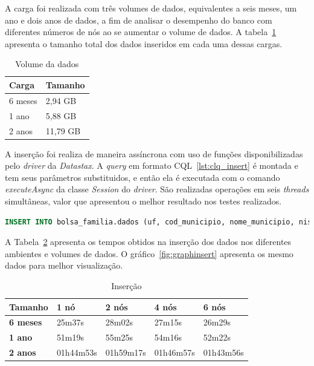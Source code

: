 A carga foi realizada com três volumes de dados, equivalentes a seis meses, um ano e dois anos de dados, a fim de analisar o desempenho do banco com diferentes números de nós ao se aumentar o volume de dados. A tabela~\ref{tab:volume} apresenta o tamanho total dos dados inseridos em cada uma dessas cargas.

\begin{table}[]
	\centering
	\caption{Volume da dados}
	\label{tab:volume}
	\begin{tabular}{ll}
		\textbf{Carga} & \textbf{Tamanho} \\ \hline
		6 meses        &  2,94 GB             \\ \hline
		1 ano          &  5,88 GB             \\ \hline
		2 anos         &  11,79 GB             \\ \hline
	\end{tabular}
\end{table}

A inserção foi realiza de maneira assíncrona com uso de funções disponibilizadas pelo \emph{driver} da \emph{Datastax}. A \emph{query} em formato CQL~\ref{lst:clq_insert} é montada e tem seus parâmetros substituidos, e então ela é executada com o comando \emph{executeAsync} da classe \emph{Session} do \emph{driver}. São realizadas operações em seis \emph{threads} simultâneas, valor que apresentou o melhor resultado nos testes realizados.

\begin{lstlisting}[caption={Código CQL para inserção},label={lst:clq_insert},language=SQL]
INSERT INTO bolsa_familia.dados (uf, cod_municipio, nome_municipio, nis_favorecido, nome_favorecido, fonte, valor, periodo) VALUES (?, ?, ?, ?, ?, ?, ?, ?)
\end{lstlisting}

A Tabela~\ref{tb_insert} apresenta os tempos obtidos na inserção dos dados nos diferentes ambientes e volumes de dados. O gráfico~\ref{fig:graphinsert} apresenta os mesmo dados para melhor visualização.


\begin{table}[]
	\centering
	\caption{Inserção}
	\label{tb_insert}
	\begin{tabular}{lllll}
		\textbf{Tamanho}	& \textbf{1 nó} & \textbf{2 nós} & \textbf{4 nós} & \textbf{6 nós} \\ \hline
		\textbf{6 meses}    & 25m37s        & 28m02s         & 27m15s         & 26m29s         \\ \hline
		\textbf{1 ano}      & 51m19s        & 55m25s         & 54m16s         & 52m22s         \\ \hline
		\textbf{2 anos}     & 01h44m53s     & 01h59m17s      & 01h46m57s      & 01h43m56s      \\ \hline
	\end{tabular}
\end{table}

